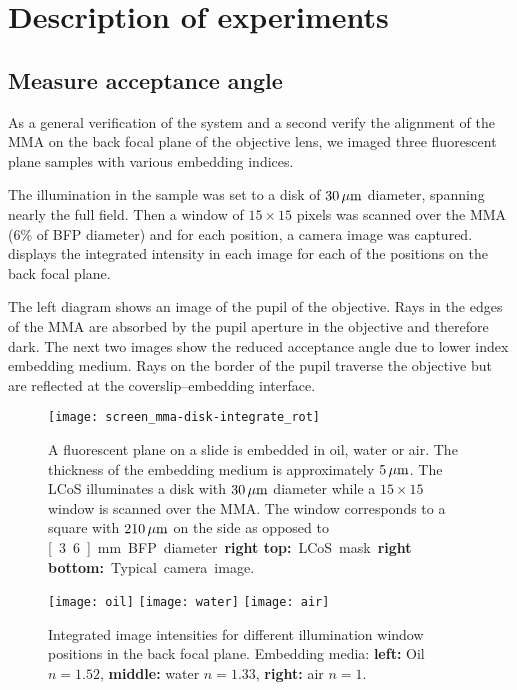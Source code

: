 \chapter{Description of experiments}
\label{sec:experiments}
\section{Measure acceptance angle}
As a general verification of the system and a second verify the
alignment of the MMA on the back focal plane of the objective lens, we
imaged three fluorescent plane samples with various embedding indices.

The illumination in the sample was set to a disk of $\unit[30]{\mu m}$
diameter, spanning nearly the full field. Then a window of
$15\times15$ pixels was scanned over the MMA (6\% of BFP diameter) and
for each position, a camera image was
captured.  displays the integrated
intensity in each image for each of the positions on the back focal
plane.

The left diagram shows an image of the pupil of the objective. Rays in
the edges of the MMA are absorbed by the pupil aperture in the
objective and therefore dark. The next two images show the reduced
acceptance angle due to lower index embedding medium. Rays on the
border of the pupil traverse the objective but are reflected at the
coverslip--embedding interface.

\begin{figure}[H]
  \centering
   
  \texttt{[image: screen\_mma-disk-integrate\_rot]}
  \caption{A fluorescent plane on a slide is embedded in oil, water or
    air. The thickness of the embedding medium is approximately
    $\unit[5]{\mu m}$. The LCoS illuminates a disk with $\unit[30]{\mu
      m}$ diameter while a $15\times 15$ window is scanned over the
    MMA. The window corresponds to a square with $\unit[210]{\mu m}$ on the side as opposed to \unit[3.6]{mm} BFP diameter {\bf right top:} LCoS mask. {\bf right bottom:} Typical
    camera image.}
  \label{fig:tirf-exp}
\end{figure}


\begin{figure}[H]
  \centering
  \texttt{[image: oil]}
  \texttt{[image: water]}
  \texttt{[image: air]}
  \caption{Integrated image intensities for different illumination
    window positions in the back focal plane. Embedding media: {\bf
      left:} Oil $n=1.52$, {\bf middle:} water $n=1.33$, {\bf right:}
    air $n=1$.  }
  \label{fig:immersion-bfp-scan}
\end{figure}

